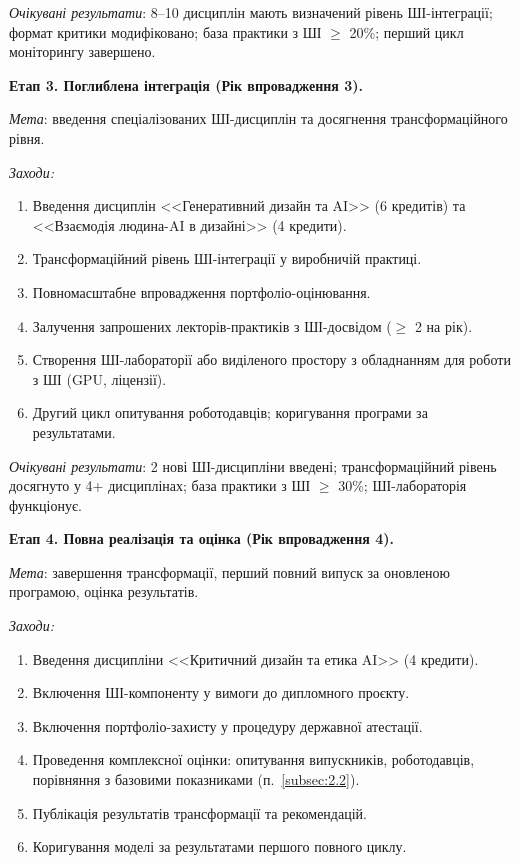 \textit{Очікувані результати}: 8--10 дисциплін мають визначений рівень ШІ-інтеграції; формат критики модифіковано; база практики з ШІ $\geq$ 20\%; перший цикл моніторингу завершено.

\textbf{Етап 3. Поглиблена інтеграція (Рік впровадження 3).}

\textit{Мета}: введення спеціалізованих ШІ-дисциплін та досягнення трансформаційного рівня.

\textit{Заходи:}
\begin{enumerate}
    \item Введення дисциплін <<Генеративний дизайн та AI>> (6 кредитів) та <<Взаємодія людина-AI в дизайні>> (4 кредити).
    \item Трансформаційний рівень ШІ-інтеграції у виробничій практиці.
    \item Повномасштабне впровадження портфоліо-оцінювання.
    \item Залучення запрошених лекторів-практиків з ШІ-досвідом ($\geq$ 2 на рік).
    \item Створення ШІ-лабораторії або виділеного простору з обладнанням для роботи з ШІ (GPU, ліцензії).
    \item Другий цикл опитування роботодавців; коригування програми за результатами.
\end{enumerate}

\textit{Очікувані результати}: 2 нові ШІ-дисципліни введені; трансформаційний рівень досягнуто у 4+ дисциплінах; база практики з ШІ $\geq$ 30\%; ШІ-лабораторія функціонує.

\textbf{Етап 4. Повна реалізація та оцінка (Рік впровадження 4).}

\textit{Мета}: завершення трансформації, перший повний випуск за оновленою програмою, оцінка результатів.

\textit{Заходи:}
\begin{enumerate}
    \item Введення дисципліни <<Критичний дизайн та етика AI>> (4 кредити).
    \item Включення ШІ-компоненту у вимоги до дипломного проєкту.
    \item Включення портфоліо-захисту у процедуру державної атестації.
    \item Проведення комплексної оцінки: опитування випускників, роботодавців, порівняння з базовими показниками (п.~\ref{subsec:2.2}).
    \item Публікація результатів трансформації та рекомендацій.
    \item Коригування моделі за результатами першого повного циклу.
\end{enumerate}

